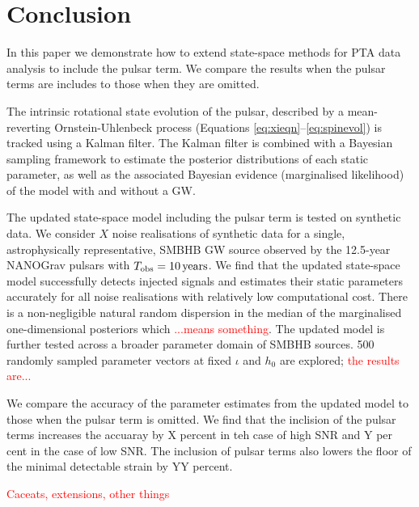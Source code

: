 \documentclass[fleqn,usenatbib,useAMS]{mnras}
\begin{document}
\section{Conclusion}\label{sec:discussion}
In this paper we demonstrate how to extend state-space methods for PTA data analysis to include the pulsar term. We compare the results when the pulsar terms are includes to those when they are omitted. \newline 




The intrinsic rotational state evolution of the pulsar, described by a mean-reverting Ornstein-Uhlenbeck process (Equations \eqref{eq:xieqn}--\eqref{eq:spinevol}) is tracked using a Kalman filter. The Kalman filter is combined with a Bayesian sampling framework to estimate the posterior distributions of each static parameter, as well as the associated Bayesian evidence (marginalised likelihood) of the model with and without a GW. \newline 



The updated state-space model including the pulsar term is tested on synthetic data. We consider $X$ noise realisations of synthetic data for a single, astrophysically representative, SMBHB GW source observed by the 12.5-year NANOGrav pulsars with $T_{\rm obs} = 10 \, {\rm years}$. We find that the updated state-space model successfully detects injected signals and estimates their static parameters accurately for all noise realisations with relatively low computational cost. There is a non-negligible natural random dispersion in the median of the marginalised one-dimensional posteriors which \textcolor{red}{...means something}. The updated model is further tested across a broader parameter domain of SMBHB sources. 500 randomly sampled parameter vectors at fixed $\iota$ and $h_0$ are explored; \textcolor{red}{the results are...} \newline 
 
 
We compare the accuracy of the parameter estimates  from the updated model to those when the pulsar term is omitted. We find that the inclision of the pulsar terms increases the accuaray by X percent in teh case of high SNR and Y per cent in the case of low SNR. The inclusion of pulsar terms also lowers the floor of the minimal detectable strain by YY percent. \newline  




\textcolor{red}{Caceats, extensions, other things}
\end{document}

